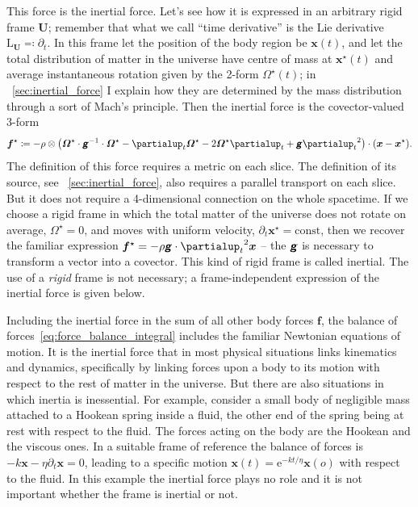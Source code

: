 \documentclass[\ifafour a4paper,12pt,\else a5paper,10pt,\fi%
onecolumn,oneside,article,%
british%
]{memoir}
\theoremstyle{remark}
\theoremstyle{innote}
\newcommand*{\mathte}[1]{\textbf{\textit{\textsf{#1}}}}
\newcommand*{\de}{\partialup}%
\newcommand*{\e}{\mathrm{e}}%
\newcommand*{\defd}{\coloneqq}
\newcommand*{\defs}{\eqqcolon}
\renewcommand*{\|}[1][]{\nonscript\,#1\vert\nonscript\;\mathopen{}}
\newcommand*{\puzzle}{{\fontencoding{U}\fontfamily{fontawesometwo}\selectfont\symbol{225}}}
\newcommand*{\psect}{{\footnotesize\puzzle}}%
\newcommand*{\Li}{\mathrm{L}}
\newcommand*{\yd}{N}
\newcommand*{\ybb}{f}
\newcommand*{\yb}{\bm{\ybb}}
\newcommand*{\ybi}{\yb^{\mathord{\star}}}
\newcommand*{\yxxt}{x}
\newcommand*{\yxt}{\bm{\yxxt}}
\newcommand*{\yxto}{\bm{\yxxt}^{\mathord{\star}}}
\newcommand*{\yomm}{\varOmega}
\newcommand*{\yom}{\bm{\yomm}^{\mathord{\star}}}
\newcommand*{\yFF}{U}
\newcommand*{\yF}{\bm{\yFF}}
\newcommand*{\ygg}{g}
\newcommand*{\yg}{\mathte{\ygg}}
\begin{document}
This force is the inertial force. Let's see how it is expressed in an
arbitrary rigid frame $\yF$; remember that what we call \enquote{time
  derivative} is the Lie derivative $\Li_{\yF} \defs \de_t$. In this frame
let the position of the body region be $\yxt(t)$, and let the total
distribution of matter in the universe have centre of mass at $\yxto(t)$
and average instantaneous rotation given by the 2-form $\yom(t)$; in
\psect~\ref{sec:inertial_force} I explain how they are determined by the
mass distribution through a sort of Mach's principle. Then the inertial
force is the covector-valued 3-form
\begin{equation}
  \label{eq:inertial_force}
  \ybi \defd  -\rho \otimes
  \bigl(\yom\cdot\yg^{-1}\cdot\yom  - \de_t\yom - 2\yom\de_t  + \yg{\de_t}^2\bigr)
  \cdot(\yxt-\yxto).
\end{equation}
The definition of this force requires a metric on each slice. The definition
of its source, see \psect~\ref{sec:inertial_force}, also requires a parallel
transport on each slice. But it does not require a 4-dimensional connection
on the whole spacetime. If we choose a rigid frame in which the total
matter of the universe does not rotate on average, $\yom=0$, and moves with
uniform velocity, $\de_t\yxto=\text{const}$, then we recover the familiar
expression $\ybi = -\rho \yg\cdot{\de_t}^2\yxt$ -- the $\yg$ is necessary to
transform a vector into a covector. This kind of rigid frame is called
inertial. The use of a \emph{rigid} frame is not necessary; a
frame-independent expression of the inertial force is given below.

Including the inertial force in the sum of all other body forces $\yb$, the
balance of forces~\eqref{eq:force_balance_integral} includes the familiar
Newtonian equations of motion. It is the inertial force that in most
physical situations links kinematics and dynamics, specifically by linking
forces upon a body to its motion with respect to the rest of matter in the
universe. But there are also situations in which inertia is inessential.
For example, consider a small body of negligible mass attached to a Hookean
spring inside a fluid, the other end of the spring being at rest with
respect to the fluid. The forces acting on the body are the Hookean and the
viscous ones. In a suitable frame of reference the balance of forces is
$-k\yxt - \eta\de_t\yxt = 0$, leading to a specific motion
$\yxt(t) = \e^{-kt/\eta}\yxt(o)$ with respect to the fluid. In this example
the inertial force plays no role and it is not important whether the frame
is inertial or not.
\end{document}
